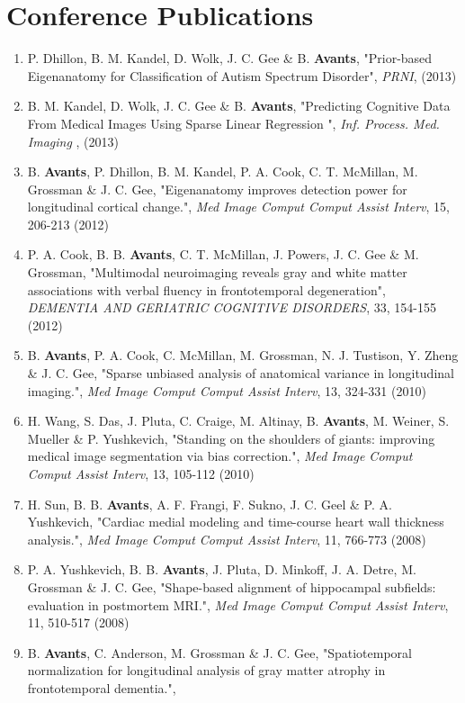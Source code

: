\documentclass[11pt]{moderncv} %
\begin{document}
\section{Conference Publications}
\begin{enumerate}
\item P. Dhillon, B. M. Kandel, D. Wolk, J. C. Gee \&  B. \textbf{Avants}, 
"Prior-based Eigenanatomy for Classification of Autism Spectrum Disorder", 
{\em PRNI}, (2013)
\item B. M. Kandel, D. Wolk, J. C. Gee \&  B. \textbf{Avants}, 
"Predicting Cognitive Data From Medical Images Using Sparse Linear Regression ", 
{\em Inf. Process. Med. Imaging}
, (2013)
\item B. \textbf{Avants}, P. Dhillon, B. M. Kandel, P. A. Cook, C. T. McMillan, M. Grossman \&  J. C. Gee, 
"Eigenanatomy improves detection power for longitudinal cortical change.", 
{\em Med Image Comput Comput Assist Interv}, 15, 206-213 (2012)
\item P. A. Cook, B. B. \textbf{Avants}, C. T. McMillan, J. Powers, J. C. Gee \&  M. Grossman, 
"Multimodal neuroimaging reveals gray and white matter associations with verbal fluency in frontotemporal degeneration", 
{\em DEMENTIA AND GERIATRIC COGNITIVE DISORDERS}, 33, 154-155 (2012)
\item B. \textbf{Avants}, P. A. Cook, C. McMillan, M. Grossman, N. J. Tustison, Y. Zheng \&  J. C. Gee, 
"Sparse unbiased analysis of anatomical variance in longitudinal imaging.", 
{\em Med Image Comput Comput Assist Interv}, 13, 324-331 (2010)
\item H. Wang, S. Das, J. Pluta, C. Craige, M. Altinay, B. \textbf{Avants}, M. Weiner, S. Mueller \&  P. Yushkevich, 
"Standing on the shoulders of giants: improving medical image segmentation via bias correction.", 
{\em Med Image Comput Comput Assist Interv}, 13, 105-112 (2010)
\item H. Sun, B. B. \textbf{Avants}, A. F. Frangi, F. Sukno, J. C. Geel \&  P. A. Yushkevich, 
"Cardiac medial modeling and time-course heart wall thickness analysis.", 
{\em Med Image Comput Comput Assist Interv}, 11, 766-773 (2008)
\item P. A. Yushkevich, B. B. \textbf{Avants}, J. Pluta, D. Minkoff, J. A. Detre, M. Grossman \&  J. C. Gee, 
"Shape-based alignment of hippocampal subfields: evaluation in postmortem MRI.", 
{\em Med Image Comput Comput Assist Interv}, 11, 510-517 (2008)
\item B. \textbf{Avants}, C. Anderson, M. Grossman \&  J. C. Gee, 
"Spatiotemporal normalization for longitudinal analysis of gray matter atrophy in frontotemporal dementia.", 

\end{enumerate}
\end{document}
